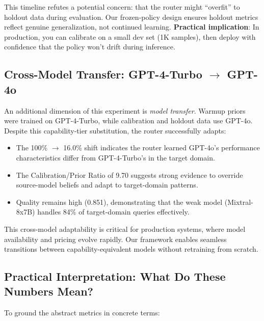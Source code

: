This timeline refutes a potential concern: that the router might ``overfit'' to holdout data during evaluation. Our frozen-policy design ensures holdout metrics reflect genuine generalization, not continued learning. \textbf{Practical implication}: In production, you can calibrate on a small dev set (1K samples), then deploy with confidence that the policy won't drift during inference.

\subsection{Cross-Model Transfer: GPT-4-Turbo $\rightarrow$ GPT-4o}

An additional dimension of this experiment is \emph{model transfer}. Warmup priors were trained on GPT-4-Turbo, while calibration and holdout data use GPT-4o. Despite this capability-tier substitution, the router successfully adapts:

\begin{itemize}
    \item The 100\% $\rightarrow$ 16.0\% shift indicates the router learned GPT-4o's performance characteristics differ from GPT-4-Turbo's in the target domain.
    \item The Calibration/Prior Ratio of 9.70 suggests strong evidence to override source-model beliefs and adapt to target-domain patterns.
    \item Quality remains high (0.851), demonstrating that the weak model (Mixtral-8x7B) handles 84\% of target-domain queries effectively.
\end{itemize}

This cross-model adaptability is critical for production systems, where model availability and pricing evolve rapidly. Our framework enables seamless transitions between capability-equivalent models without retraining from scratch.

\subsection{Practical Interpretation: What Do These Numbers Mean?}

To ground the abstract metrics in concrete terms:

